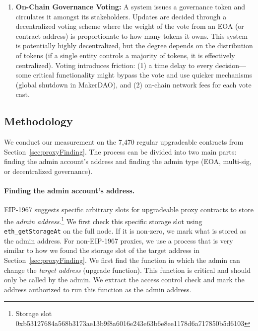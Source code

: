 \begin{enumerate}
\item \textbf{On-Chain Governance Voting:} A system issues a governance token and circulates it amongst its stakeholders. Updates are decided through a decentralized voting scheme where the weight of the vote from an EOA (or contract address) is proportionate to how many tokens it owns. This system is potentially highly decentralized, but the degree depends on the distribution of tokens (\eg if a single entity controls a majority of tokens, it is effectively centralized). Voting introduces friction: (1) a time delay to every decision---some critical functionality might bypass the vote and use quicker mechanisms (\eg global shutdown in MakerDAO), and (2) on-chain network fees for each vote cast.

\end{enumerate}

\subsection{Methodology}


We conduct our measurement on the 7,470 regular upgradeable contracts from Section~\ref{sec:proxyFinding}. The process can be divided into two main parts: finding the admin account's address and finding the admin type (EOA, multi-sig, or decentralized governance).

\paragraph{Finding the admin account's address.} EIP-1967 suggests specific arbitrary slots for upgradeable proxy contracts to store the \textit{admin address}.\footnote{Storage slot 0xb53127684a568b3173ae13b9f8a6016e243e63b6e8ee1178d6a717850b5d6103} We first check this specific storage slot using \texttt{eth\_getStorageAt} on the full node. If it is non-zero, we mark what is stored as the admin address. 
For non-EIP-1967 proxies, we use a process that is very similar to how we found the storage slot of the target address in Section~\ref{sec:proxyFinding}. We first find the function in which the admin can change the \textit{target address} (upgrade function). This function is critical and should only be called by the admin. We extract the access control check and mark the address authorized to run this function as the admin address.

